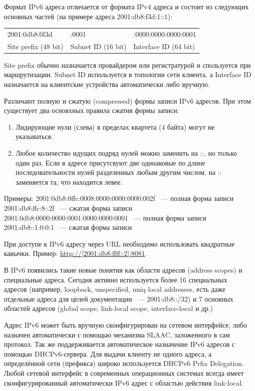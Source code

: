 \documentclass[10pt, a5paper]{article}
\begin{document}
Формат IPv6 адреса отличается от формата IPv4 адреса и состоит из следующих основных частей (на примере адреса 2001:db8:f3d:1::1):

\begin{table}[h!]
  \centering
  \begin{tabular}{ l l l }
    2001:0db8:0f3d  & :0001  & :0000:0000:0000:0001  \\
     Site prefix (48 bit)  &  Subnet ID (16 bit)  &  Interface ID (64 bit)  \\
  \end{tabular}
\end{table}
Site prefix обычно назначается провайдером или регистратурой и спользуется при маршрутизации. Subnet ID используется в топологии сети клиента, а Interface ID назначается на клиентские устройства автоматически либо вручную.

Различают полную и сжатую (compressed) формы записи IPv6 адресов. При этом существует два основхных правила сжатия формы записи:

\begin{enumerate}
  \item Лидирующие нули (слева) в пределах квартета (4 байта) могут не указываться.
  \item Любое количество идущих подряд нулей можно заменить на ::, но только один раз. Если в адресе присутсвуют две одинаковые по длине последовательности нулей разделенных любым другим числом, на :: заменяется та, что находится левее.
\end{enumerate}

Примеры:
2001:0db8:0ffc:0008:0000:0000:0000:002f ~--- полная форма записи
2001:db8:ffc:8::2f ~--- сжатая форма записи
2001:0db8:0000:0000:0001:0000:0000:0001 ~--- полная форма записи
2001:db8::1:0:0:1 ~--- сжатая форма записи

При доступе к IPv6 адресу через URL необходимо использовать квадратные кавычки. Пример: \url{ http://[2001:db8:ffff::2]:8081}.

В IPv6 появились такие новые понятия как области адресов (address scopes) и специальные адреса. Сегодня активно используется более 16 специальных адресов (например, loopback, unspecified, uniq local addresses, есть даже отдельные адреса для целей документации ~--- 2001:db8::/32) и 7 основных областей адресов (global scope, link-local scope, interface-local и др.)

Адрес IPv6 может быть вручную сконфигурирован на сетевом интерфейсе, либо назначен автоматически с помощью механизма SLAAC, заложенного в сам протокол. Так же поддерживается автоматическое назначение IPv6 адресов с помощью DHCPv6-сервера. Для выдачи клиенту не одного адреса, а определённой сети (префикса) широко используется DHCPv6 Prfix Delegation. ~\cite{Semernik-4} Любой сетевой интерфейс в современных операционных системах всегда имеет сконфигурированный автоматически IPv6 адрес с областью действия link-local.
\end{document}
